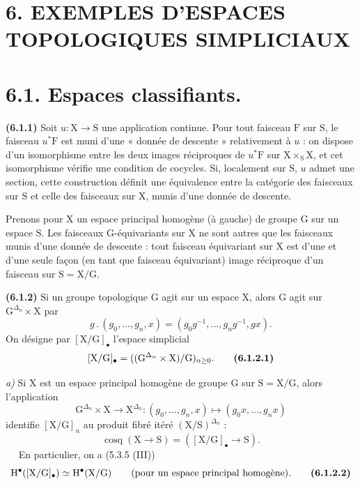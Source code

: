 \documentclass[11pt,leqno]{article}
\newcommand{\Page}[1]{\ifvmode\noindent\else\unskip\ \fi{\footnotesize\textcolor{gray}{[p.\,#1]}}\ \ignorespaces}
\begin{document}
\section*{6. EXEMPLES D’ESPACES TOPOLOGIQUES SIMPLICIAUX}

\section*{6.1. Espaces classifiants.}

\textbf{(6.1.1)} Soit \(u:\mathrm{X}\to\mathrm{S}\) une application continue. Pour tout faisceau \(\mathrm{F}\) sur \(\mathrm{S}\), le faisceau \(u^*\mathrm{F}\) est muni d’une « donnée de descente » relativement à \(u\) : on dispose d’un isomorphisme entre les deux images réciproques de \(u^*\mathrm{F}\) sur \(\mathrm{X}\times_{\mathrm{S}}\mathrm{X}\), et cet isomorphisme vérifie une condition de cocycles. Si, localement sur \(\mathrm{S}\), \(u\) admet une section, cette construction définit une équivalence entre la catégorie des faisceaux sur \(\mathrm{S}\) et celle des faisceaux sur \(\mathrm{X}\), munis d’une donnée de descente.

Prenons pour \(\mathrm{X}\) un espace principal homogène (à gauche) de groupe \(\mathrm{G}\) sur un espace \(\mathrm{S}\). Les faisceaux \(\mathrm{G}\)-équivariants sur \(\mathrm{X}\) ne sont autres que les faisceaux munis d’une donnée de descente : tout faisceau équivariant sur \(\mathrm{X}\) est d’une et d’une seule façon (en tant que faisceau équivariant) image réciproque d’un faisceau sur \(\mathrm{S}=\mathrm{X}/\mathrm{G}\).

\textbf{(6.1.2)} Si un groupe topologique \(\mathrm{G}\) agit sur un espace \(\mathrm{X}\), alors \(\mathrm{G}\) agit sur \(\mathrm{G}^{\Delta_n}\times\mathrm{X}\) par
\[
g\mathbin{.}(g_0,\ldots,g_n,x)
=(g_0g^{-1},\ldots,g_ng^{-1},gx).
\]
On désigne par \([\mathrm{X}/\mathrm{G}]_{\bullet}\) l’espace simplicial
\[
[\mathrm{X}/\mathrm{G}]_{\bullet}
=((\mathrm{G}^{\Delta_n}\times\mathrm{X})/\mathrm{G})_{n\geq 0}.
\tag*{\textbf{(6.1.2.1)}}
\]

\textit{a)} Si \(\mathrm{X}\) est un espace principal homogène de groupe \(\mathrm{G}\) sur \(\mathrm{S}=\mathrm{X}/\mathrm{G}\), alors l’application
\[
\mathrm{G}^{\Delta_n}\times\mathrm{X}\to\mathrm{X}^{\Delta_n}:
(g_0,\ldots,g_n,x)\mapsto(g_0x,\ldots,g_nx)
\]
identifie \([\mathrm{X}/\mathrm{G}]_n\) au produit fibré itéré \((\mathrm{X}/\mathrm{S})^{\Delta_n}\) :
\[
\operatorname{cosq}(\mathrm{X}\to\mathrm{S})
=([\mathrm{X}/\mathrm{G}]_{\bullet}\to\mathrm{S}).
\]
\Page{17}
En particulier, on a (5.3.5 (III))
\[
\mathrm{H}^{\bullet}([\mathrm{X}/\mathrm{G}]_{\bullet})
\simeq\mathrm{H}^{\bullet}(\mathrm{X}/\mathrm{G})
\qquad\text{(pour un espace principal homogène).}
\tag*{\textbf{(6.1.2.2)}}
\]
\end{document}
